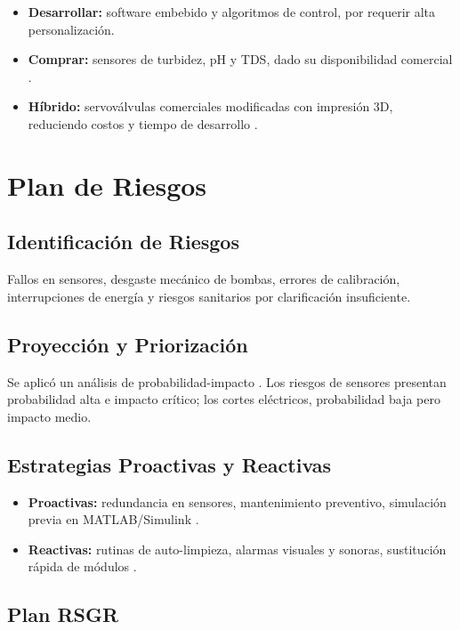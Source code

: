 \documentclass[conference]{IEEEtran}
\begin{document}
	\begin{itemize}
		\item \textbf{Desarrollar:} software embebido y algoritmos de control, por requerir alta personalización.
		\item \textbf{Comprar:} sensores de turbidez, pH y TDS, dado su disponibilidad comercial \cite{b19}.
		\item \textbf{Híbrido:} servoválvulas comerciales modificadas con impresión 3D, reduciendo costos y tiempo de desarrollo \cite{b20}.
	\end{itemize}
	
	\section{Plan de Riesgos}
	
	\subsection{Identificación de Riesgos}
	
	Fallos en sensores, desgaste mecánico de bombas, errores de calibración, interrupciones de energía y riesgos sanitarios por clarificación insuficiente.
	
	\subsection{Proyección y Priorización}
	
	Se aplicó un análisis de probabilidad-impacto \cite{b21}. Los riesgos de sensores presentan probabilidad alta e impacto crítico; los cortes eléctricos, probabilidad baja pero impacto medio.
	
	\subsection{Estrategias Proactivas y Reactivas}
	
	\begin{itemize}
		\item \textbf{Proactivas:} redundancia en sensores, mantenimiento preventivo, simulación previa en MATLAB/Simulink \cite{b22}.
		\item \textbf{Reactivas:} rutinas de auto-limpieza, alarmas visuales y sonoras, sustitución rápida de módulos \cite{b23}.
	\end{itemize}
	
	\subsection{Plan RSGR}
	
\end{document}
